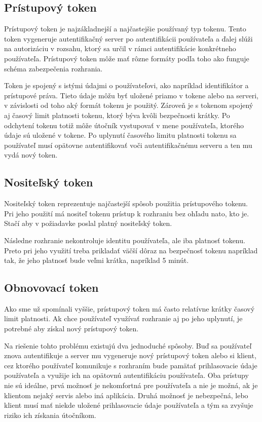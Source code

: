 \subsection{Prístupový token}

Prístupový token \cite{access_token} je najzákladnejší a najčastejšie používaný typ tokenu. Tento token vygeneruje autentifikačný server po autentifikácii používateľa a ďalej slúži na autorizáciu v rozsahu, ktorý sa určil v rámci autentifikácie konkrétneho používateľa. Prístupový token môže mať rôzne formáty podľa toho ako funguje schéma zabezpečenia rozhrania.

Token je spojený s istými údajmi o používateľovi, ako napríklad identifikátor a prístupové práva. Tieto údaje môžu byť uložené priamo v tokene alebo na serveri, v závislosti od toho aký formát tokenu je použitý. Zároveň je s tokenom spojený aj časový limit platnosti tokenu, ktorý býva kvôli bezpečnosti krátky. Po odchytení tokenu totiž môže útočník vystupovať v mene používateľa, ktorého údaje sú uložené v tokene. Po uplynutí časového limitu platnosti tokenu sa používateľ musí opätovne autentifikovať voči autentifikačnému serveru a ten mu vydá nový token.


\subsection{Nositeľský token}

Nositeľský token reprezentuje najčastejší spôsob použitia prístupového tokenu. Pri jeho použití má nositeľ tokenu prístup k rozhraniu bez ohľadu nato, kto je. Stačí aby v požiadavke poslal platný nositeľský token.

Následne rozhranie nekontroluje identitu používateľa, ale iba platnosť tokenu. Preto pri jeho využití treba prikladať väčší dôraz na bezpečnosť tokenu napríklad tak, že jeho platnosť bude veľmi krátka, napríklad 5 minút.


\subsection{Obnovovací token}

Ako sme už spomínali vyššie, prístupový token má často relatívne krátky časový limit platnosti. Ak chce používateľ využívať rozhranie aj po jeho uplynutí, je potrebné aby získal nový prístupový token.

Na riešenie tohto problému existujú dva jednoduché spôsoby. Buď sa používateľ znova autentifikuje a server mu vygeneruje nový prístupový token alebo si klient, cez ktorého používateľ komunikuje s rozhraním bude pamätať prihlasovacie údaje používateľa a využije ich na opätovnú autentifikáciu používateľa. Oba prístupy nie sú ideálne, prvá možnosť je nekomfortná pre používateľa a nie je možná, ak je klientom nejaký servis alebo iná aplikácia. Druhá možnosť je nebezpečná, lebo klient musí mať niekde uložené prihlasovacie údaje používateľa a tým sa zvyšuje riziko ich získania útočníkom.

